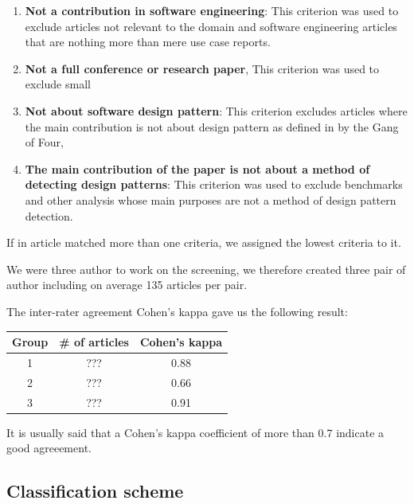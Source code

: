 \documentclass[letterpaper, 10 pt, conference]{ieeeconf}  %
\begin{document}
\begin{enumerate}
  \item \textbf{Not a contribution in software engineering}: 
    This criterion was used to exclude articles not relevant to the domain and
    software engineering articles that are nothing more than mere use case
    reports.
  \item \textbf{Not a full conference or research paper},
    This criterion was used to exclude small
  \item \textbf{Not about software design pattern}:
    This criterion excludes articles where the main contribution is not about
    design pattern as defined in by the Gang of Four,
  \item \textbf{The main contribution of the paper is not about a method of detecting design patterns}:
    This criterion was used to exclude benchmarks and other analysis whose main
    purposes are not a method of design pattern detection.
\end{enumerate}

If in article matched more than one criteria, we assigned the lowest criteria
to it.

We were three author to work on the screening, we therefore created three pair
of author including on average 135 articles per pair.

The inter-rater agreement Cohen's kappa gave us the following result:

\begin{center}
  \begin{tabular}{ ccc }
    \bf Group & \bf \# of articles & \bf Cohen's kappa \\
    \hline
    1 & ??? & 0.88 \\
    2 & ??? & 0.66 \\
    3 & ??? & 0.91 \\
  \end{tabular}
\end{center}

It is usually said that a Cohen's kappa coefficient of more than $0.7$ indicate
a good agreeement. %

\subsection{Classification scheme}
\end{document}
